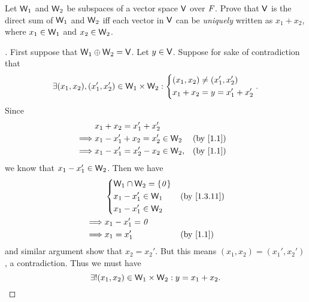 \begin{ex}\label{ex:1.3.30}
	Let \(\mathsf{W}_1\) and \(\mathsf{W}_2\) be subspaces of a vector space \(\mathsf{V}\) over \(\mathit{F}\).
	Prove that \(\mathsf{V}\) is the direct sum of \(\mathsf{W}_1\) and \(\mathsf{W}_2\) iff each vector in \(\mathsf{V}\) can be \emph{uniquely} written as \(x_1 + x_2\), where \(x_1 \in \mathsf{W}_1\) and \(x_2 \in \mathsf{W}_2\).
\end{ex}

\begin{proof}[]
	First suppose that \(\mathsf{W}_1 \oplus \mathsf{W}_2 = \mathsf{V}\).
	Let \(y \in \mathsf{V}\).
	Suppose for sake of contradiction that
	\[
		\exists (x_1, x_2), (x_1', x_2') \in \mathsf{W}_1 \times \mathsf{W}_2 : \begin{dcases}
			(x_1, x_2) \neq (x_1', x_2') \\
			x_1 + x_2 = y = x_1' + x_2'
		\end{dcases}.
	\]
	Since
	\begin{align*}
		         & x_1 + x_2 = x_1' + x_2'                         \\
		\implies & x_1 - x_1' + x_2 = x_2' \in \W_2  &  & \by{1.1} \\
		\implies & x_1 - x_1' = x_2' - x_2 \in \W_2, &  & \by{1.1}
	\end{align*}
	we know that \(x_1 - x_1' \in \mathsf{W}_2\).
	Then we have
	\begin{align*}
		         & \begin{dcases}
			           \W_1 \cap \W_2 = \set{\zv} \\
			           x_1 - x_1' \in \W_1        \\
			           x_1 - x_1' \in \W_2
		           \end{dcases} &  & \by{1.3.11}               \\
		\implies & x_1 - x_1' = \zv                            \\
		\implies & x_1 = x_1'                    &  & \by{1.1}
	\end{align*}
	and similar argument show that \(x_2 = x_2'\).
	But this means \((x_1, x_2) = (x_1', x_2')\), a contradiction.
	Thus we must have
	\[
		\exists! (x_1, x_2) \in \mathsf{W}_1 \times \mathsf{W}_2 : y = x_1 + x_2.
	\]


\end{proof}
